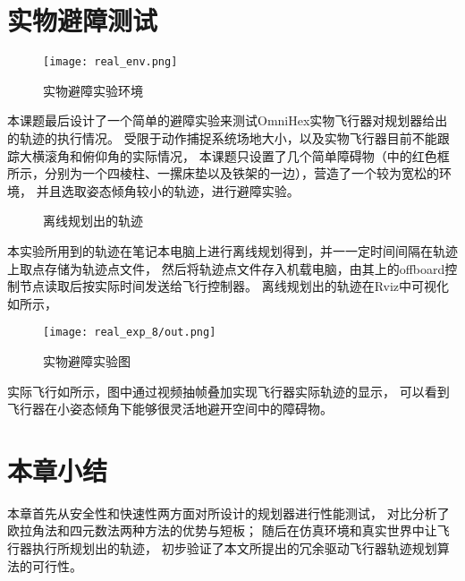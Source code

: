 \section{实物避障测试}\label{sec:real_world_experiments}
\begin{figure}[!ht]
    \centering
    \texttt{[image: real\_env.png]}
    \caption{实物避障实验环境}
    \label{fig:real_env}
\end{figure}

本课题最后设计了一个简单的避障实验来测试OmniHex实物飞行器对规划器给出的轨迹的执行情况。
受限于动作捕捉系统场地大小，以及实物飞行器目前不能跟踪大横滚角和俯仰角的实际情况，
本课题只设置了几个简单障碍物（中的红色框所示，分别为一个四棱柱、一摞床垫以及铁架的一边），营造了一个较为宽松的环境，
并且选取姿态倾角较小的轨迹，进行避障实验。

\begin{figure}[!ht]
    \setlength{\subfigcapskip}{-1bp}
    \centering
    \begin{minipage}{\textwidth}
  
    \centering
    \subfigure{\label{fig:offline_traj_1}}\addtocounter{subfigure}{-2}
    \subfigure{\label{fig:offline_traj_2}}\addtocounter{subfigure}{-2}

    
    \end{minipage}
    \caption{离线规划出的轨迹}
    \label{fig:trajectory_from_offline_planning}
\end{figure}

本实验所用到的轨迹在笔记本电脑上进行离线规划得到，并一一定时间间隔在轨迹上取点存储为轨迹点文件，
然后将轨迹点文件存入机载电脑，由其上的offboard控制节点读取后按实际时间发送给飞行控制器。
离线规划出的轨迹在Rviz中可视化如所示，

\begin{figure}[!ht]
    \centering
    \texttt{[image: real\_exp\_8/out.png]}
    \caption{实物避障实验图}
    \label{fig:real_flight}
\end{figure}

实际飞行如所示，图中通过视频抽帧叠加实现飞行器实际轨迹的显示，
可以看到飞行器在小姿态倾角下能够很灵活地避开空间中的障碍物。

\section{本章小结}\label{sec:summary_5}
本章首先从安全性和快速性两方面对所设计的规划器进行性能测试，
对比分析了欧拉角法和四元数法两种方法的优势与短板；
随后在仿真环境和真实世界中让飞行器执行所规划出的轨迹，
初步验证了本文所提出的冗余驱动飞行器轨迹规划算法的可行性。
